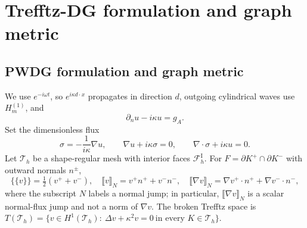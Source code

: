 \documentclass[11pt]{article}
\newcommand{\ii}{i}
\newcommand{\Th}{\mathcal{T}_h}
\newcommand{\FhI}{\mathcal{F}_h^{\mathrm I}}
\newcommand{\avg}[1]{\{\!\!\{#1\}\!\!\}}
\newcommand{\jump}[1]{\llbracket #1\rrbracket}
\numberwithin{equation}{section}
\begin{document}
\section{Trefftz-DG formulation and graph metric}\label{sec:dg}
\subsection{PWDG formulation and graph metric}
We use $e^{-\ii\omega t}$, so $e^{\ii\kappa d\cdot x}$ propagates in direction $d$, outgoing cylindrical waves use $H_m^{(1)}$, and
\begin{equation}\label{eq:outgoing}
 \partial_nu-\ii\kappa u=g_A.
\end{equation}
Set the dimensionless flux
\begin{equation}\label{eq:sigma-def}
 \sigma=-\frac{1}{\ii\kappa}\nabla u,\qquad
 \nabla u+\ii\kappa\sigma=0,\qquad
 \nabla\cdot\sigma+\ii\kappa u=0.
\end{equation}
Let $\Th$ be a shape-regular mesh with interior faces $\FhI$.  For $F=\partial K^+\cap\partial K^-$ with outward normals $n^\pm$,
\begin{equation}\label{eq:jumps}
 \avg{v}=\tfrac12(v^++v^-),\quad
 \jump{v}_N=v^+n^++v^-n^-,\quad
 \jump{\nabla v}_N=\nabla v^+\cdot n^+ + \nabla v^-\cdot n^- ,
\end{equation}
where the subscript $N$ labels a normal jump; in particular, $\jump{\nabla v}_N$ is a scalar normal-flux jump and not a norm of $\nabla v$.  The broken Trefftz space is $T(\Th)=\{v\in H^1(\Th):\ \Delta v+\kappa^2v=0\ \text{in every }K\in\Th\}$.
\end{document}
